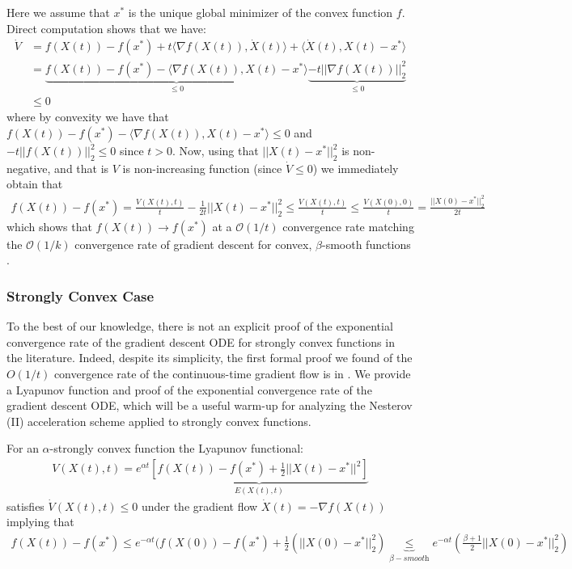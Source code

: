\proofstart
Here we assume that $x^*$ is the unique global minimizer of the convex function $f$. Direct computation shows that we have:
\begin{align*}
    \dot{V} &= f(X(t)) - f(x^*) + t \langle \nabla f(X(t)), \dot{X}(t) \rangle + \langle \dot{X}(t), X(t)-x^* \rangle \\
    &= \underbrace{f(X(t)) - f(x^*) - \langle \nabla f(X(t)), X(t) - x^* \rangle}_{\leq 0} \underbrace{- t || \nabla f(X(t))||_2^2}_{\leq 0} \\
    &\leq 0
\end{align*}
where by convexity we have that $f(X(t)) - f(x^*) - \langle \nabla f(X(t)), X(t) - x^* \rangle \leq 0$ and $ - t ||f(X(t))||_2^2 \leq 0$ since $t>0$. Now, using that $||X(t)-x^*||_2^2$ is non-negative, and that is $V$ is non-increasing function (since $\dot{V} \leq 0$) we immediately obtain that
\begin{align*}
    f(X(t)) - f(x^*) = \frac{V(X(t), t)}{t} - \frac{1}{2t} ||X(t) - x^*||_2^2 \leq \frac{V(X(t), t)}{t} \leq \frac{V(X(0), 0)}{t} = \frac{||X(0)-x^*||_2^2}{2t}
\end{align*}
which shows that $f(X(t)) \to f(x^*)$ at a $\mathcal{O}(1/t)$ convergence rate matching the $\mathcal{O}(1/k)$ convergence rate of gradient descent for convex, $\beta$-smooth functions \citep{DBLP:journals/ftml/Bubeck15}.
\proofend

\subsubsection{Strongly Convex Case}
To the best of our knowledge, there is not an explicit proof of the exponential convergence rate of the gradient descent ODE for strongly convex functions in the literature. Indeed, despite its simplicity, the first formal proof we found of the $O(1/t)$ convergence rate of the continuous-time gradient flow is in \citet{su2014differential}. We provide a Lyapunov function and proof of the exponential convergence rate of the gradient descent ODE, which will be a useful warm-up for analyzing the Nesterov (II) acceleration scheme applied to strongly convex functions.

\begin{theorem}
For an $\alpha$-strongly convex function the Lyapunov functional:
\begin{align*}
    V(X(t), t) = e^{\alpha t} \underbrace{\left[ f(X(t)) - f(x^*) + \frac{1}{2}||X(t)-x^*||^2 \right]}_{E(X(t), t)}
\end{align*}
satisfies $\dot{V}(X(t), t) \leq 0$ under the gradient flow $\dot{X}(t) = -\nabla f(X(t))$ implying that
\begin{align}
f(X(t)) - f(x^*) \leq e^{-\alpha t} (f(X(0))-f(x^*)+\frac{1}{2}(||X(0)-x^*||_2^2) \underbrace{\leq}_{\beta-\textit{smooth}} e^{-\alpha t} \left( \frac{\beta+1}{2} ||X(0) - x^*||_2^2 \right) 
\end{align}
\end{theorem}

